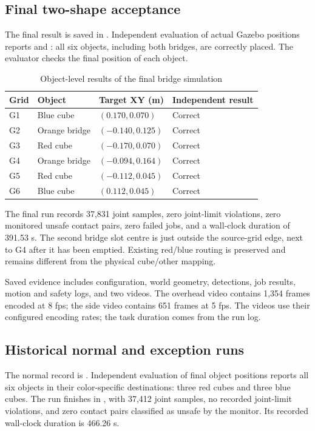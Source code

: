 \subsection{Final two-shape acceptance}
The final result is saved in . Independent evaluation of actual Gazebo positions reports  and : all six objects, including both bridges, are correctly placed. The evaluator checks the final position of each object.

\begin{table}[H]\tabstart
\caption{Object-level results of the final bridge simulation}
\begin{tabularx}{\textwidth}{@{}L{1.2cm}Y L{4cm}L{3cm}@{}}
\toprule Grid & Object & Target XY (m) & Independent result\\\midrule
G1 & Blue cube & $(0.170,0.070)$ & Correct\\
G2 & Orange bridge & $(-0.140,0.125)$ & Correct\\
G3 & Red cube & $(-0.170,0.070)$ & Correct\\
G4 & Orange bridge & $(-0.094,0.164)$ & Correct\\
G5 & Red cube & $(-0.112,0.045)$ & Correct\\
G6 & Blue cube & $(0.112,0.045)$ & Correct\\\bottomrule
\end{tabularx}\end{table}

The final run records 37,831 joint samples, zero joint-limit violations, zero monitored unsafe contact pairs, zero failed jobs, and a wall-clock duration of 391.53 s. The second bridge slot centre is just outside the source-grid edge, next to G4 after it has been emptied. Existing red/blue routing is preserved and remains different from the physical cube/other mapping.

Saved evidence includes configuration, world geometry, detections, job results, motion and safety logs, and two videos. The overhead video contains 1,354 frames encoded at 8 fps; the side video contains 651 frames at 5 fps. The videos use their configured encoding rates; the task duration comes from the run log.

\subsection{Historical normal and exception runs}
The normal record is . Independent evaluation of final object positions reports all six objects in their color-specific destinations: three red cubes and three blue cubes. The run finishes in , with 37,412 joint samples, no recorded joint-limit violations, and zero contact pairs classified as unsafe by the monitor. Its recorded wall-clock duration is 466.26 s.

